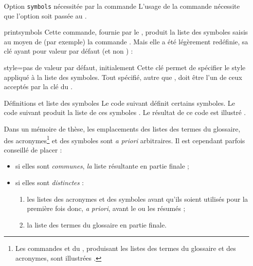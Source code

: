 \begin{dbwarning}{Option \texttt{symbols} nécessitée par la commande
    \protect{}}{}
  L'usage de la commande  nécessite que l'option
   soit passée au .
\end{dbwarning}

\begin{docCommand}{printsymbols}{}
  Cette commande, fournie par le , produit la liste des
  symboles saisis au moyen de (par exemple) la commande
  . Mais elle a été légèrement redéfinie, sa clé
   ayant pour valeur par défaut  (et non
  ) :
  \begin{docKey}{style}{=\textbar{}}{pas de valeur
      par défaut, initialement }
    Cette clé permet de spécifier le style appliqué à la liste des
    symboles. Tout  spécifié, autre que ,
    doit être l'un de ceux acceptés par la clé  du
    .
  \end{docKey}
\end{docCommand}

\begin{dbexample}{Définitions et liste des symboles}{}
  Le code suivant définit certains symboles.
  Le code suivant produit la liste de ces symboles .
  Le résultat de ce code est illustré .
\end{dbexample}

Dans un mémoire de thèse, les emplacements des listes des termes du glossaire,
des acronymes\footnote{Les commandes  et
   du , produisant les listes
  des termes du glossaire et des acronymes, sont illustrées
  .} et des symboles sont \emph{a
  priori} arbitraires. Il est cependant parfois conseillé de placer :
\begin{itemize}
\item si elles sont \emph{communes}, \emph{la} liste résultante en partie finale ;
\item si elles sont \emph{distinctes} :
  \begin{enumerate}
  \item les listes des acronymes et des symboles avant qu'ils soient utilisés
    pour la première fois donc, \emph{a priori}, avant le ou les résumés ;
  \item la liste des termes du glossaire en partie finale.
  \end{enumerate}
\end{itemize}

